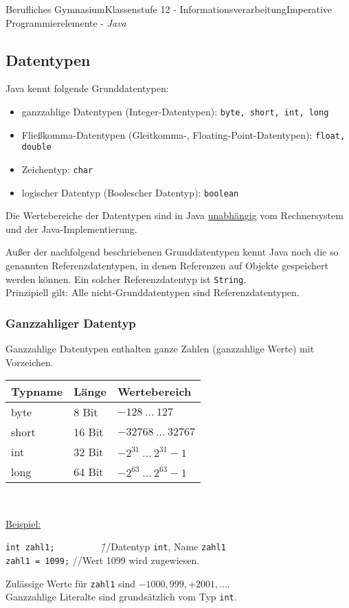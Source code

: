 \documentclass[oneside,openany,headings=optiontotoc,11pt,numbers=noenddot]{article}
\begin{document}
\begin{worksheet}{Berufliches Gymnasium}{Klassenstufe 12 - Informationsverarbeitung}{Imperative Programmierelemente - \textit{Java}}
		\subsection{Datentypen}
		Java kennt folgende Grunddatentypen:
		\begin{itemize}
			\item ganzzahlige Datentypen (Integer-Datentypen): \lstinline[style=JavaInputStyle]|byte, short, int, long|
			\item Fließkomma-Datentypen (Gleitkomma-, Floating-Point-Datentypen): \lstinline[style=JavaInputStyle]|float, double|
			\item Zeichentyp: \lstinline[style=JavaInputStyle]|char|
			\item logischer Datentyp (Boolescher Datentyp): \lstinline[style=JavaInputStyle]|boolean|
		\end{itemize}
		Die Wertebereiche der Datentypen sind in Java \underline{unabhängig} vom Rechnersystem und der Java-Implementierung.\\
		\par\noindent
		Außer der nachfolgend beschriebenen Grunddatentypen kennt Java noch die so genannten Referenzdatentypen, in denen Referenzen auf Objekte gespeichert werden können. Ein solcher Referenzdatentyp ist \lstinline[style=JavaInputStyle]|String|.\\
		Prinzipiell gilt: Alle nicht-Grunddatentypen sind Referenzdatentypen.
		\subsubsection{Ganzzahliger Datentyp}
		Ganzzahlige Datentypen enthalten ganze Zahlen (ganzzahlige Werte) mit Vorzeichen.\\
		\par\noindent
		\begin{tabularx}{\textwidth}{|l|l|X|}
			\hline
			\textbf{Typname} & \textbf{Länge} & \textbf{Wertebereich}\\
			\hline
			byte & 8 Bit & \(-128\ \ldots\ 127\)\\
			\hline
			short & 16 Bit & \(-32768\ \ldots\ 32767\)\\
			\hline
			int & 32 Bit & \(-2^{31}\ \ldots\ 2^{31}-1\)\\
			\hline
			long & 64 Bit & \(-2^{63}\ \ldots\ 2^{63}-1\)\\
			\hline
		\end{tabularx}\\
		\par\noindent
		\underline{Beispiel:}
		\begin{tabbing}
			\lstinline[style=JavaInputStyle]|int zahl1;|~~~~~~~~~ \= \= //Datentyp \lstinline[style=JavaInputStyle]|int|, Name \lstinline[style=JavaInputStyle]|zahl1|\\
			\lstinline[style=JavaInputStyle]|zahl1 = 1099;| \> \> //Wert 1099 wird zugewiesen.
		\end{tabbing}
		Zulässige Werte für \lstinline[style=JavaInputStyle]|zahl1| sind \(-1000, 999, +2001, \ldots\).\\
		Ganzzahlige Literalte sind grundsätzlich vom Typ \lstinline[style=JavaInputStyle]|int|.

\end{worksheet}
\end{document}
